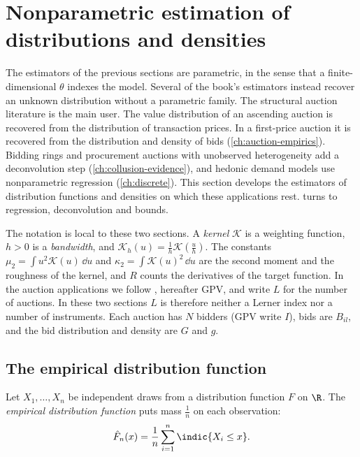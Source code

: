 \section{Nonparametric estimation of distributions and densities}\label{sec:A-kde}

The estimators of the previous sections are parametric, in the sense that a finite-dimensional $\theta$ indexes
the model. Several of the book's estimators instead recover an unknown distribution without a parametric family. The
structural auction literature is the main user. The value distribution of an ascending auction is
recovered from the distribution of transaction prices. In a first-price auction it is recovered from the
distribution and density of bids (\cref{ch:auction-empirics}). Bidding
rings and procurement auctions with unobserved heterogeneity add a deconvolution step
(\cref{ch:collusion-evidence}), and hedonic demand models use nonparametric regression
(\cref{ch:discrete}). This section develops the estimators of distribution functions and densities on
which these applications rest.  turns to regression, deconvolution and bounds.

The notation is local to these two sections. A \emph{kernel} $\mathcal{K}$ is a weighting function,
$h>0$ is a \emph{bandwidth}, and $\mathcal{K}_h(u)=\frac{1}{h}\mathcal{K}(\frac{u}{h})$. The constants
$\mu_2=\int u^2\mathcal{K}(u)\,\dd u$ and $\kappa_2=\int\mathcal{K}(u)^2\,\dd u$ are the second moment
and the roughness of the kernel, and $R$ counts the derivatives of the target function. In the auction
applications we follow \citet{GuerrePerrigneVuong2000}, hereafter GPV, and write $L$ for the number of
auctions. In these two sections $L$ is therefore neither a Lerner index nor a number of instruments. Each auction has $N$
bidders (GPV write $I$), bids are $B_{il}$, and the bid distribution and density are $G$ and $g$.

\subsection{The empirical distribution function}\label{sec:A-ecdf}

Let $X_1,\dots,X_n$ be independent draws from a distribution function $F$ on $\R$. The
\emph{empirical distribution function} puts mass $\frac{1}{n}$ on each observation:
\begin{equation}\label{eq:A-ecdf}
\hat F_n(x)=\frac{1}{n}\sum_{i=1}^{n}\indic\{X_i\le x\}.
\end{equation}

